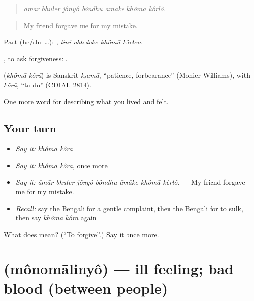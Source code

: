 \begin{quote}
\emph{āmār bhuler jônyô bôndhu āmāke khômā kôrlô.}
\end{quote}

\begin{quote}
My friend forgave me for my mistake.
\end{quote}

Past (he/she …):    , \emph{tini chheleke khômā kôrlen}.

 , to ask forgiveness:   .

\begin{cousinweb}
\textbf{ } (\emph{khômā kôrā}) is Sanskrit \emph{kṣamā}, \textquotedblleft{}patience, forbearance\textquotedblright{} (Monier-Williams), with \emph{kôrā}, \textquotedblleft{}to do\textquotedblright{} (CDIAL 2814).
\end{cousinweb}

\begin{grammarlens}[title={What you've built}]
One more word for describing what you lived and felt.
\end{grammarlens}

\subsection*{Your turn}
\begin{itemize}
\raggedright
  \item \emph{Say it:} \emph{khômā kôrā}
  \item \emph{Say it:} \emph{khômā kôrā}, once more
  \item \emph{Say it:} \emph{āmār bhuler jônyô bôndhu āmāke khômā kôrlô.} — My friend forgave me for my mistake.
  \item \emph{Recall:} say the Bengali for a gentle complaint, then the Bengali for to sulk, then say \emph{khômā kôrā} again
\end{itemize}

\begin{tcolorbox}[breakable,colback=teal!4,colframe=teal!35!black,title={Before you move on}]
What does   mean? (\textquotedblleft{}To forgive\textquotedblright{}.) Say it once more.
\end{tcolorbox}
\section[\texorpdfstring{\bn{মনোমালিন্য} (mônomālinyô)}{মনোমালিন্য (mônomālinyô)}]{ (mônomālinyô) — ill feeling; bad blood (between people)}

